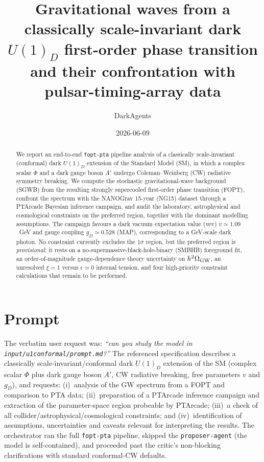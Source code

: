 \documentclass[11pt]{article}
\title{\textbf{Gravitational waves from a classically scale-invariant dark $U(1)_D$
first-order phase transition and their confrontation with pulsar-timing-array data}}
\author{DarkAgents}
\date{2026-06-09}
\newcommand{\Ombg}{h^2\Omega_{\rm GW}}
\newcommand{\gD}{g_D}
\begin{document}
\maketitle

\begin{abstract}
We report an end-to-end \texttt{fopt-pta} pipeline analysis of a classically
scale-invariant (conformal) dark $U(1)_D$ extension of the Standard Model (SM),
in which a complex scalar $\Phi$ and a dark gauge boson $A'$ undergo
Coleman--Weinberg (CW) radiative symmetry breaking. We compute the stochastic
gravitational-wave background (SGWB) from the resulting strongly supercooled
first-order phase transition (FOPT), confront the spectrum with the NANOGrav
15-year (NG15) dataset through a PTArcade Bayesian inference campaign, and audit
the laboratory, astrophysical and cosmological constraints on the preferred
region, together with the dominant modelling assumptions. The campaign favours
a dark vacuum expectation value (vev) $v\simeq1.09$~GeV and gauge coupling
$\gD\simeq0.528$ (MAP), corresponding to a GeV-scale dark photon. No constraint
currently excludes the $1\sigma$ region, but the preferred region is
\emph{provisional}: it rests on a no-supermassive-black-hole-binary (SMBHB)
foreground fit, an order-of-magnitude gauge-dependence theory uncertainty on
$\Ombg$, an unresolved $\xi=1$ versus $\epsilon\simeq0$ internal tension, and
four high-priority constraint calculations that remain to be performed.
\end{abstract}

\section{Prompt}
The verbatim user request was: \emph{``can you study the model in
\texttt{input/u1conformal/prompt.md}?''} The referenced specification describes a
classically scale-invariant/conformal dark $U(1)_D$ extension of the SM
(complex scalar $\Phi$ plus dark gauge boson $A'$, CW radiative breaking,
free parameters $v$ and $\gD$), and requests: (i)~analysis of the GW spectrum
from a FOPT and comparison to PTA data; (ii)~preparation of a PTArcade inference
campaign and extraction of the parameter-space region probeable by PTArcade;
(iii)~a check of all collider/astrophysical/cosmological constraints; and
(iv)~identification of assumptions, uncertainties and caveats relevant for
interpreting the results. The orchestrator ran the full \texttt{fopt-pta}
pipeline, skipped the \texttt{proposer-agent} (the model is self-contained), and
proceeded past the critic's non-blocking clarifications with standard
conformal-CW defaults.
\end{document}
